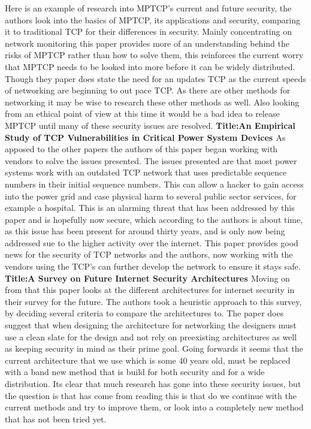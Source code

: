 \documentclass{scrartcl}
\begin{document}
	\newline
Here is an example of research into MPTCP's current and future security, the authors look into the basics of MPTCP, its applications and security, comparing it to traditional TCP for their differences in security. Mainly concentrating on network monitoring this paper provides more of an understanding behind the risks of MPTCP rather than how to solve them, this reinforces the current worry that MPTCP needs to be looked into more before it can be widely distributed. Though they paper does state the need for an updates TCP as the current speeds of networking are beginning to out pace TCP. As there are other methods for networking it may be wise to research these other methods as well. Also looking from an ethical point of view at this time it would be a bad idea to release MPTCP until many of these security issues are resolved.
	\newline
	\newline
	\newline
	\textbf{Title:An Empirical Study of TCP Vulnerabilities in Critical Power System Devices \cite{Vulnerablilities}}
	\newline
As apposed to the other papers the authors of this paper began working with vendors to solve the issues presented. The issues presented are that most power systems work with an outdated TCP network that uses predictable sequence numbers in their initial sequence numbers. This can allow a hacker to gain access into the power grid and case physical harm to several public sector services, for example a hospital. This is an alarming threat that has been addressed by this paper and is hopefully now secure, which according to the authors is about time, as this issue has been present for around thirty years, and is only now being addressed sue to the higher activity over the internet. This paper provides good news for the security of TCP networks and the authors, now working with the vendors using the TCP's can further develop the network to ensure it stays safe.
	\newline
	\newline
	\newline
	\textbf{Title:A Survey on Future Internet Security Architectures \cite{Future}}
	\newline
Moving on from that this paper looks at the different architectures for internet security in their survey for the future. The authors took a heuristic approach to this survey, by deciding several criteria to compare the architectures to. The paper does suggest that when designing the architecture for networking the designers must use a clean slate for the design and not rely on preexisting architectures as well as keeping security in mind as their prime goal. Going forwards it seems that the current architecture that we use which is some 40 years old, must be replaced with a band new method that is build for both security and for a wide distribution.
Its clear that much research has gone into these security issues, but the question is that has come from reading this is that do we continue with the current methods and try to improve them, or look into a completely new method that has not been tried yet.
	
	
	
	
	
\end{document}
